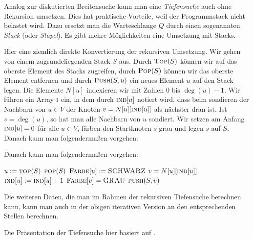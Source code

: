 \begin{bem}
	Analog zur diskutierten Breitensuche kann man eine \emph{Tiefensuche} auch ohne Rekursion umsetzen.
	Dies hat praktische Vorteile, weil der Programmstack nicht  belastet wird.
	Dazu ersetzt man die Warteschlange $Q$ durch einen sogenannten \emph{Stack} (oder \emph{Stapel}). Es gibt mehre Möglichkeiten eine Umsetzung mit Stacks. 
	
	Hier eine ziemlich direkte Konvertierung der rekursiven Umsetzung. Wir gehen von einem zugrundeliegenden Stack $S$ aus. Durch $\mathop{\text{\textsc{Top}}}(S)$ können wir auf das oberste Element des Stacks zugreifen, durch $\mathop{\text{\textsc{Pop}}}(S)$ können wir das oberste Element entfernen und durch $\mathop{\text{\textsc{Push}}}(S,u)$ ein neues Element $u$ auf den Stack legen. Die Elemente $N[u]$ indexieren wir mit Zahlen $0$ bis $\deg(u)-1$. Wir führen ein Array $\mathop{\text{\textsc{i}}}$ ein, in dem durch $\mathop{\text{\textsc{ind}}}[u]$ notiert wird, dass beim sondieren der Nachbarn von $u \in V$  der Knoten $v=N[u][\mathop{\text{\textsc{ind}}}[u]]$ als  nächster dran ist. Ist $v= \deg(u)$, so hat man alle Nachbarn von $u$ sondiert. Wir setzen am Anfang $\mathop{\text{\textsc{ind}}}[u]=0$ für alle $u \in V$, färben den Startknoten $s$ grau und legen $s$ auf $S$. Danach kann man folgendermaßen vorgehen: 
	

	Danach kann man folgendermaßen vorgehen: 
	
\begin{algorithm}[H]
	\begin{algorithmic}[1]
			\STATE $u:= \mathop{\text{\textsc{top}}}(S)$
				\STATE $\mathop{\text{\textsc{pop}}}(S)$ 
				\STATE $\mathop{\text{\textsc{Farbe}}}[u] := \mathop{\text{\textsc{SCHWARZ}}}$
				\ELSE
				\STATE $v=N[u][\mathop{\text{\textsc{ind}}}[u]]$
				\STATE $\mathop{\text{\textsc{ind}}}[u]:=\mathop{\text{\textsc{ind}}}[u]+1$				
					\STATE $\mathop{\text{\textsc{Farbe}}}[v] = \mathop{\text{\textsc{GRAU}}}$
					\STATE $\mathop{\text{\textsc{push}}}(S,v)$
				\ENDIF 
				\ENDIF 
		\ENDWHILE  
	\end{algorithmic}
\end{algorithm}
	
	Die weiteren Daten, die man im Rahmen der rekursiven Tiefensuche berechnen kann, kann man auch in der obigen iterativen Version an den entsprechenden Stellen berechnen. 
\end{bem}

\begin{bem}
	Die Präsentation der Tiefensuche hier basiert auf  \cite{CLRS17}.
\end{bem} 